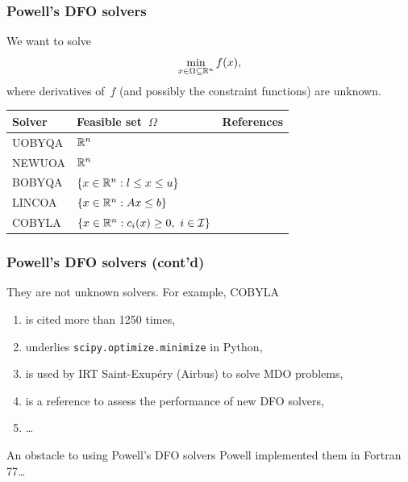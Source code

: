 \documentclass{polyu-presentation}
\newcommand{\con}[1][]{c\ifthenelse{\equal{#1}{}}{}{_{#1}}}
\newcommand{\fset}{\Omega}
\newcommand{\iub}{\mathcal{I}}
\newcommand{\iter}[1][]{x\ifthenelse{\equal{#1}{}}{}{^{#1}}}
\newcommand{\obj}{f}
\newcommand{\xl}{l}
\newcommand{\xu}{u}
\begin{document}
\begin{frame}
    \frametitle{Powell's DFO solvers}

    We want to solve
    \begin{equation*}
        \min_{\iter \in \fset \subseteq \R^n} \obj(\iter),
    \end{equation*}
    where derivatives of~$\obj$ (and possibly the constraint functions) are \alert{unknown}.

    \bigskip

    \begin{center}
        \begin{tabular}{lll}
            \toprule
            Solver  & Feasible set~$\Omega$                                 & References\\
            \midrule
            UOBYQA  & $\mathbb{R}^n$                                                & \textcite{Powell_2002}\\
            NEWUOA  & $\mathbb{R}^n$                                                & \textcite{Powell_2006}\\
            BOBYQA  & $\set{x \in \R^n : \xl \le x \le \xu}$                & \textcite{Powell_2009}\\
            LINCOA  & $\{x \in \mathbb{R}^n : A x \le b\}$                        & \textcite{Powell_2015}\\
            COBYLA  & $\set{x \in \R^n : \con[i](x) \ge 0, ~ i \in \iub}$   & \textcite{Powell_1994}\\
            \bottomrule
        \end{tabular}
    \end{center}
\end{frame}

\begin{frame}
    \frametitle{Powell's DFO solvers (cont'd)}

    They are \alert{not} unknown solvers.
    For example, COBYLA
    \begin{enumerate}
        \item is cited more than \alert{\num{1250} times},
        \item underlies \texttt{scipy.optimize.minimize} in Python,
        \item is used by IRT Saint-Exup{\'{e}}ry (\alert{Airbus}) to solve MDO problems,
        \item is a reference to assess the performance of new DFO solvers,
        \item \dots
    \end{enumerate}

    \bigskip

    \begin{block}{An obstacle to using Powell’s DFO solvers}
        Powell implemented them in \alert{Fortran 77}\dots
    \end{block}
\end{frame}
\end{document}
